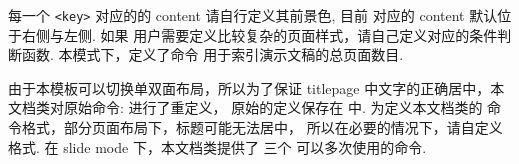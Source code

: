 每一个 \texttt{<key>} 对应的的 content 请自行定义其前景色, 目前  对应的 content 默认位于右侧与左侧. 如果 
用户需要定义比较复杂的页面样式，请自己定义对应的条件判断函数. 本模式下，定义了命令 \cmd[F]{\pageref{zslide-last-page}}
用于索引演示文稿的总页面数目.

由于本模板可以切换单双面布局，所以为了保证 titlepage 中文字的正确居中，本文档类对原始命令:\cmd{\maketitle} 进行了重定义，
原始的定义保存在 \cmd[F]{\orimaketitle} 中. 为定义本文档类的 \cmd{\maketitle} 命令格式，部分页面布局下，标题可能无法居中，
所以在必要的情况下，请自定义格式. 在 slide mode 下，本文档类提供了 \cmd[F]{\zslideTitle,\zslideAuthor,\zslideDate} 三个
可以多次使用的命令.

